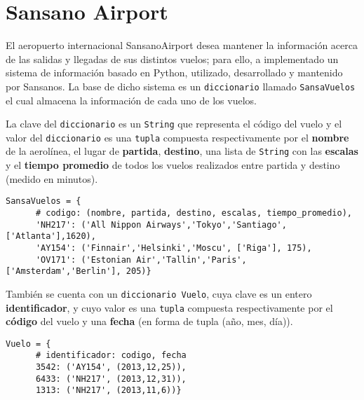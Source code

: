 \section{Sansano Airport}

  El aeropuerto internacional SansanoAirport desea
  mantener la información acerca de las salidas
  y llegadas de sus distintos vuelos;
  para ello,
  a implementado un sistema de información
  basado en Python,
  utilizado,
  desarrollado y mantenido por Sansanos.
  La base de dicho sistema
  es un \texttt{diccionario}
  llamado \texttt{SansaVuelos}
  el cual almacena la información
  de cada uno de los vuelos.
  
  La clave del \texttt{diccionario}
  es un \texttt{String} que representa el código
  del vuelo y el valor del \texttt{diccionario}
  es una \texttt{tupla} compuesta respectivamente
  por el \textbf{nombre} de la aerolínea,
  el lugar de \textbf{partida},
  \textbf{destino},
  una lista de \texttt{String} con las \textbf{escalas}
  y el \textbf{tiempo promedio}
  de todos los vuelos realizados entre partida y destino
  (medido en minutos).
  
  \begin{lstlisting}[style=mypy]
    SansaVuelos = {
      # codigo: (nombre, partida, destino, escalas, tiempo_promedio),
      'NH217': ('All Nippon Airways','Tokyo','Santiago', ['Atlanta'],1620),
      'AY154': ('Finnair','Helsinki','Moscu', ['Riga'], 175),
      'OV171': ('Estonian Air','Tallin','Paris', ['Amsterdam','Berlin'], 205)}
  \end{lstlisting}
  
  También se cuenta con un \texttt{diccionario Vuelo},
  cuya clave es un entero \textbf{identificador},
  y cuyo valor es una \texttt{tupla}
  compuesta respectivamente por el \textbf{código}
  del vuelo y una \textbf{fecha}
  (en forma de tupla (año, mes, día)).
  
  \begin{lstlisting}[style=mypy]
    Vuelo = {
      # identificador: codigo, fecha
      3542: ('AY154', (2013,12,25)),
      6433: ('NH217', (2013,12,31)),
      1313: ('NH217', (2013,11,6))}
  \end{lstlisting}
  
